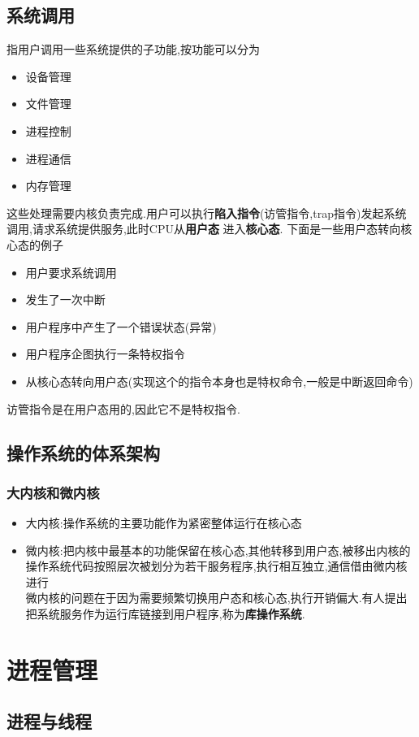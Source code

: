 \documentclass{ctexart}
\begin{document}
\subsection{系统调用}
指用户调用一些系统提供的子功能,按功能可以分为
\begin{itemize}
	\item 设备管理
	\item 文件管理
	\item 进程控制
	\item 进程通信
	\item 内存管理
\end{itemize}
这些处理需要内核负责完成.用户可以执行\textbf{陷入指令}(访管指令,trap指令)发起系统调用,请求系统提供服务,此时CPU从\textbf{用户态}
进入\textbf{核心态}.
下面是一些用户态转向核心态的例子
\begin{itemize}
	\item 用户要求系统调用
	\item 发生了一次中断
	\item 用户程序中产生了一个错误状态(异常)
	\item 用户程序企图执行一条特权指令
	\item 从核心态转向用户态(实现这个的指令本身也是特权命令,一般是中断返回命令)
\end{itemize}
访管指令是在用户态用的,因此它不是特权指令.
\subsection{操作系统的体系架构}
\subsubsection{大内核和微内核}
\begin{itemize}
	\item 大内核:操作系统的主要功能作为紧密整体运行在核心态
	\item 微内核:把内核中最基本的功能保留在核心态,其他转移到用户态,被移出内核的操作系统代码按照层次被划分为若干服务程序,执行相互独立,通信借由微内核进行\\
	      微内核的问题在于因为需要频繁切换用户态和核心态,执行开销偏大.有人提出把系统服务作为运行库链接到用户程序,称为\textbf{库操作系统}.
\end{itemize}

\section{进程管理}
\subsection{进程与线程}
\end{document}
